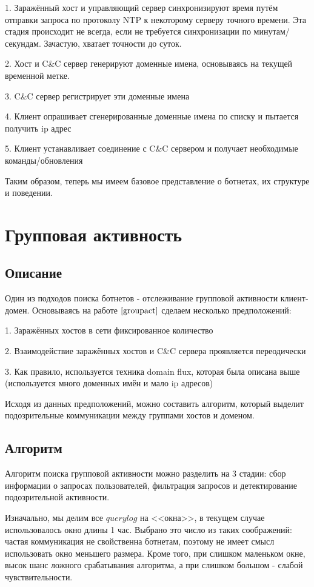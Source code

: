 \documentclass[14pt]{extreport} %
\begin{document}
1. Заражённый хост и управляющий сервер синхронизируют время путём отправки запроса по протоколу NTP к некоторому серверу точного времени. Эта стадия происходит не всегда, если не требуется синхронизации по минутам/секундам. Зачастую, хватает точности до суток.
	
2. Хост и C\&C сервер генерируют доменные имена, основываясь на текущей временной метке.
	
3. C\&C сервер регистрирует эти доменные имена
	
4. Клиент опрашивает сгенерированные доменные имена по списку и пытается получить ip адрес
	
5. Клиент устанавливает соединение с C\&C сервером и получает необходимые команды/обновления
	
Таким образом, теперь мы имеем базовое представление о ботнетах, их структуре и поведении.

\chapter{Групповая активность}
\label{chap:groupact}
\section{Описание}
Один из подходов поиска ботнетов - отслеживание групповой активности клиент-домен. Основываясь на работе $\cite{groupact}$ сделаем несколько предположений:
	
1. Заражённых хостов в сети фиксированное количество
	
2. Взаимодействие заражённых хостов и C\&C сервера проявляется переодически
	
3. Как правило, используется техника domain flux, которая была описана выше (используется много доменных имён и мало ip адресов)
	
Исходя из данных предположений, можно составить алгоритм, который выделит подозрительные коммуникации между группами хостов и доменом.
	
\section{Алгоритм}
	
Алгоритм поиска групповой активности можно разделить на 3 стадии: сбор информации о запросах пользователей, фильтрация запросов и детектирование подозрительной активности. 
	
Изначально, мы делим все $querylog$ на <<окна>>, в текущем случае использовалось окно длины 1 час. Выбрано это число из таких соображений: частая коммуникация не свойственна ботнетам, поэтому не имеет смысл использовать окно меньшего размера. Кроме того, при слишком маленьком окне, высок шанс ложного срабатывания алгоритма, а при слишком большом - слабой чувствительности.
	
\end{document}
